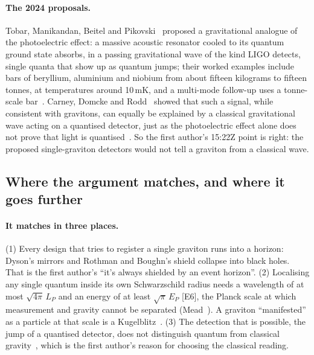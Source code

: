 \documentclass[11pt,a4paper]{article}
\theoremstyle{definition}
\theoremstyle{remark}
\newcommand{\chk}[1]{\textsf{[#1]}}
\begin{document}
\paragraph{The 2024 proposals.} Tobar, Manikandan, Beitel and Pikovski~\cite{tobar} proposed a gravitational analogue of the
photoelectric effect: a massive acoustic resonator cooled to its quantum ground state absorbs, in a passing gravitational wave of the
kind LIGO detects, single quanta that show up as quantum jumps; their worked examples include bars of beryllium, aluminium and niobium
from about fifteen kilograms to fifteen tonnes, at temperatures around 10\,mK, and a multi-mode follow-up uses a tonne-scale bar~\cite{tobar2}.
Carney, Domcke and Rodd~\cite{cdr} showed that such a signal, while consistent with gravitons, can equally be explained by a classical
gravitational wave acting on a quantised detector, just as the photoelectric effect alone does not prove that light is
quantised~\cite{carney2}. So the first author's 15:22Z point is right: the proposed single-graviton detectors would not tell a graviton
from a classical wave.

\subsection{Where the argument matches, and where it goes further}

\paragraph{It matches in three places.} (1) Every design that tries to register a single graviton runs into a horizon: Dyson's mirrors
and Rothman and Boughn's shield collapse into black holes. That is the first author's ``it's always shielded by an event horizon''. (2)
Localising any single quantum inside its own Schwarzschild radius needs a wavelength of at most $\sqrt{4\pi}\,L_P$ and an energy of at
least $\sqrt\pi\,E_P$ \chk{E6}, the Planck scale at which measurement and gravity cannot be separated (Mead~\cite{mead}). A graviton
``manifested'' as a particle at that scale is a Kugelblitz~\cite{wheeler}. (3) The detection that is possible, the jump of a quantised
detector, does not distinguish quantum from classical gravity~\cite{cdr}, which is the first author's reason for choosing the classical
reading.
\end{document}
